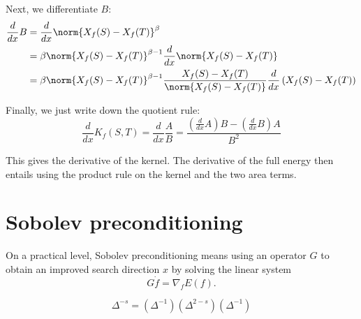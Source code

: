 \documentclass[11pt]{article}
\newcommand{\ddx}{\frac{d}{dx}}
\begin{document}
Next, we differentiate $B$:
\begin{align*}
\ddx B &= \ddx \norm{X_f(S) - X_f(T)}^{\beta}\\
&= \beta \norm{X_f(S) - X_f(T)}^{\beta - 1} \ddx \norm{X_f(S) - X_f(T)}\\
&= \beta \norm{X_f(S) - X_f(T)}^{\beta - 1} \frac{X_f(S) - X_f(T)}{\norm{X_f(S) - X_f(T)}} \ddx \left(X_f(S) - X_f(T)\right)
\end{align*}

Finally, we just write down the quotient rule:
$$\ddx K_f(S, T) = \ddx \frac{A}{B} = \frac{(\ddx A) B - (\ddx B) A}{B^2}$$

This gives the derivative of the kernel. The derivative of the full energy then entails using the product rule on the kernel and the two area terms.

\section{Sobolev preconditioning}

On a practical level, Sobolev preconditioning means using an operator $G$ to obtain an improved search direction $x$ by solving the linear system $$G\dot{f} = \nabla_f E(f).$$

$$\Delta^{-s} = (\Delta^{-1}) (\Delta^{2-s}) (\Delta^{-1})$$
\end{document}
